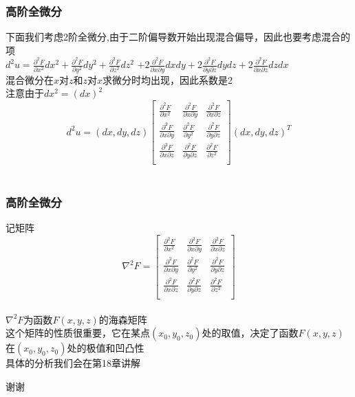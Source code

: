 \documentclass[xetex]{beamer}
\begin{document}
\begin{frame}
\frametitle{高阶全微分}
	下面我们考虑2阶全微分,由于二阶偏导数开始出现混合偏导，因此也要考虑混合的项\\
	$ d^2u=\frac{\partial^2 F}{\partial x^2}dx^2+\frac{\partial^2 F}{\partial y^2}dy^2+\frac{\partial^2 F}{\partial z^2}dz^2$ $+2\frac{\partial^2 F}{\partial x\partial y}dxdy+2\frac{\partial^2 F}{\partial y\partial z}dydz+2\frac{\partial^2 F}{\partial x\partial z}dzdx$\\ \pause
	混合微分在$x$对$z$和$z$对$x$求微分时均出现，因此系数是2\\
	注意由于$dx^2=(dx)^2$\\ \pause
	$$d^2u=(dx,dy,dz)\left[
	\begin{matrix}
		\frac{\partial^2 F}{\partial x^2} & \frac{\partial^2 F}{\partial x\partial y} & \frac{\partial^2 F}{\partial x\partial z}\\
		\frac{\partial^2 F}{\partial x\partial y} & \frac{\partial^2 F}{\partial y^2} & \frac{\partial^2 F}{\partial y\partial z}\\
		\frac{\partial^2 F}{\partial x\partial z} & \frac{\partial^2 F}{\partial y\partial z} & \frac{\partial^2 F}{\partial z^2}\\
	\end{matrix}
	\right](dx,dy,dz)^T $$\\ \pause

	
\end{frame}

\begin{frame}
	\frametitle{高阶全微分}
		记矩阵$$\nabla^2F = \left[
	\begin{matrix}
	\frac{\partial^2 F}{\partial x^2} & \frac{\partial^2 F}{\partial x\partial y} & \frac{\partial^2 F}{\partial x\partial z}\\
	\frac{\partial^2 F}{\partial x\partial y} & \frac{\partial^2 F}{\partial y^2} & \frac{\partial^2 F}{\partial y\partial z}\\
	\frac{\partial^2 F}{\partial x\partial z} & \frac{\partial^2 F}{\partial y\partial z} & \frac{\partial^2 F}{\partial z^2}\\
	\end{matrix}
	\right] $$\\
	$\nabla^2 F$为函数$F(x,y,z)$的海森矩阵\\ \quad
	这个矩阵的性质很重要，它在某点$(x_0,y_0,z_0)$处的取值，决定了函数$F(x,y,z)$在$(x_0,y_0,z_0)$处的极值和凹凸性\\
	具体的分析我们会在第18章讲解\\
	
\end{frame}

\begin{frame}[standout]
	谢谢
\end{frame}
\end{document}
